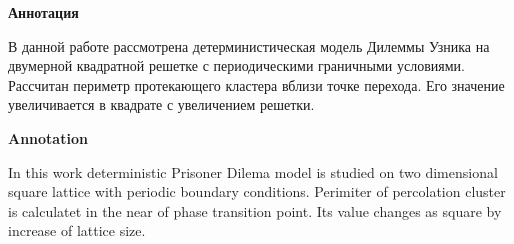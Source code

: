 \documentclass[14pt]{article}
\begin{document}
\tableofcontents
\newpage
\begin{center}\textbf{Аннотация}\end{center}
\par В данной работе рассмотрена детерминистическая модель Дилеммы Узника на двумерной квадратной решетке с периодическими граничными условиями. Рассчитан периметр протекающего кластера вблизи точке перехода. Его значение увеличивается в квадрате с увеличением решетки.
\newpage
\begin{center}\textbf{Annotation}\end{center}
\par In this work deterministic Prisoner Dilema model is studied on two dimensional square lattice with periodic boundary conditions. Perimiter of percolation cluster is calculatet in the near of phase transition point. Its value changes as square by increase of lattice size.
\newpage
\end{document}
